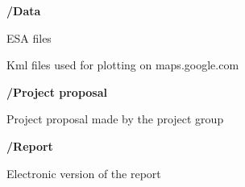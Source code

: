 \textbf{/Data}\\
\vspace{-10mm}
    \begin{pitemize}
        \item ESA files
        \item Kml files used for plotting on maps.google.com
    \end{pitemize}
      
\textbf{/Project proposal}\\
\vspace{-10mm} 
\begin{pitemize}
    \item Project proposal made by the project group
\end{pitemize}
    
\textbf{/Report}\\
\vspace{-10mm} 
\begin{pitemize}
    \item Electronic version of the report
\end{pitemize}   
    
